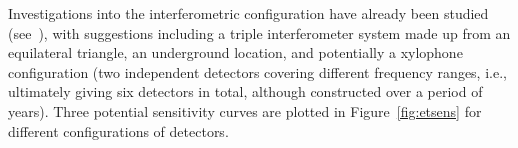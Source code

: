 Investigations into the interferometric configuration have already been studied
(see~\cite{Freise:2008, Hild:2008, Hild:2010}), with suggestions including a
triple interferometer system made up from an equilateral triangle, an
underground location, and potentially a xylophone configuration (two independent
detectors covering different frequency ranges, i.e., ultimately giving six
detectors in total, although constructed over a period of years). Three
potential sensitivity curves are plotted in Figure~\ref{fig:etsens} for different
configurations of detectors.
